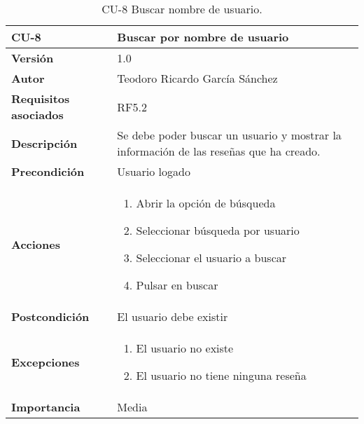 \begin{table}[p]
	\centering
	\begin{tabularx}{\linewidth}{ p{} p{} }
		\toprule
		\textbf{CU-8}    & \textbf{Buscar por nombre de usuario}\\
		\toprule
		\textbf{Versión}              & 1.0    \\
		\textbf{Autor}                & Teodoro Ricardo García Sánchez \\
		\textbf{Requisitos asociados} & RF5.2 \\
		\textbf{Descripción}          & Se debe poder buscar un usuario y mostrar la información de las reseñas que ha creado. \\
		\textbf{Precondición}         & Usuario logado \\
		\textbf{Acciones}             &
		\begin{enumerate}
			\def\labelenumi{\arabic{enumi}.}
			\tightlist
			\item Abrir la opción de búsqueda
			\item Seleccionar búsqueda por usuario
			\item Seleccionar el usuario a buscar
			\item Pulsar en buscar
		\end{enumerate}\\
		\textbf{Postcondición}        & El usuario debe existir \\
		\textbf{Excepciones}          & 
		\begin{enumerate}
			\item El usuario no existe
			\item El usuario no tiene ninguna reseña 
		\end{enumerate}\\
		\textbf{Importancia}          & Media \\
		\bottomrule
	\end{tabularx}
	\caption{CU-8 Buscar nombre de usuario.}
\end{table}
